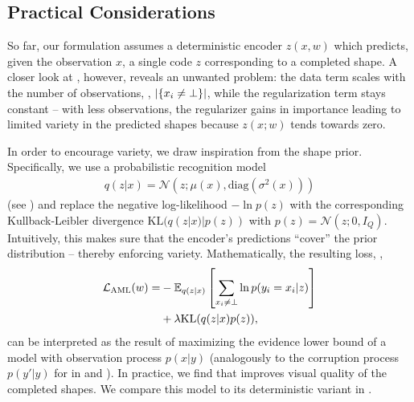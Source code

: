\subsection{Practical Considerations}



%
So far, our \AML formulation assumes a deterministic encoder $z(x,w)$ which predicts, given the observation $x$, a single code $z$ corresponding to a completed shape. A closer look at , however, reveals an unwanted problem: the data term scales with the number of observations, \ie, $|\{x_i \neq \bot\}|$, while the regularization term stays constant -- with less observations, the regularizer gains in importance leading to limited variety in the predicted shapes because $z(x; w)$ tends towards zero.

In order to encourage variety, we draw inspiration from the \VAE shape prior. Specifically, we use a probabilistic recognition model
%
\begin{align}
q(z|x) = \mathcal{N}(z; \mu(x), \text{diag}(\sigma^2(x)))
\end{align}
%
(\cf see ) and replace the negative log-likelihood $-\ln p(z)$ with the corresponding Kullback-Leibler divergence $\text{KL}(q(z|x)|p(z))$ with $p(z) = \mathcal{N}(z; 0, I_Q)$. Intuitively, this makes sure that the encoder's predictions ``cover'' the prior distribution -- thereby enforcing variety. Mathematically, the resulting loss, \ie, 
%
\begin{align}
\begin{split}
    \mathcal{L}_{\text{AML}}(w) =& - \mathbb{E}_{q(z|x)}\left[\sum_{x_i \neq \bot} \ln p(y_i = x_i | z)\right]\\
    &+ \lambda \text{KL}(q(z|x)p(z)),\label{eq:daml}
\end{split}
\end{align}
%
can be interpreted as the result of maximizing the evidence lower bound of a model with observation process $p(x | y)$ (analogously to the corruption process $p(y'|y)$ for \DVAEs in \citep{Im2017AAAI} and ).  In practice, we find that  improves visual quality of the completed shapes. We compare this \AML model to its deterministic variant \dAML in .

